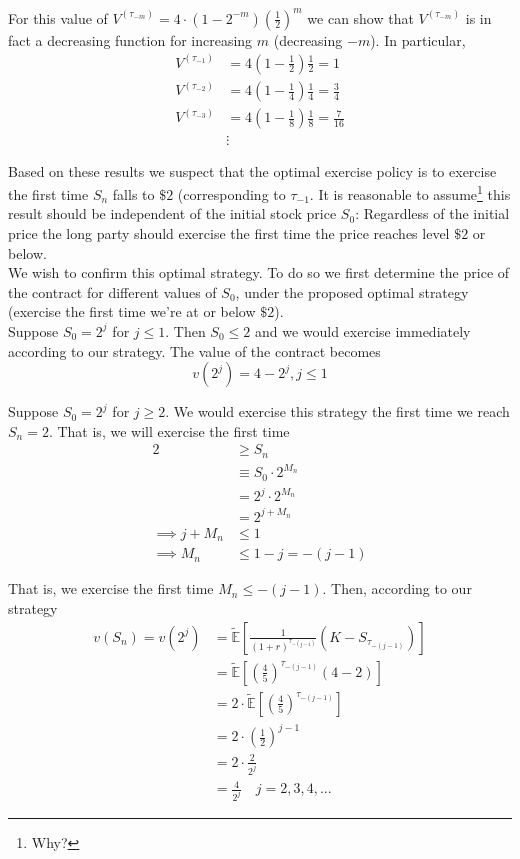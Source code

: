 \documentclass[12pt]{article}
\newlength\tindent
\renewcommand{\indent}{\hspace*{\tindent}}
\newcommand{\E}{\mathbb E}
\begin{document}
\indent For this value of $V^{(\tau_{-m})} = 4\cdot(1 - 2^{-m}) \left( \frac{1}{2}\right)^m$ we can show that $V^{(\tau_{-m})}$ is in fact a decreasing function for increasing $m$ (decreasing $-m$). In particular,
\begin{align*}
	V^{(\tau_{-1})} &= 4 \left(1 - \frac{1}{2}\right)\frac{1}{2} = 1 \\
	V^{(\tau_{-2})} &= 4 \left(1 - \frac{1}{4}\right)\frac{1}{4} = \frac{3}{4} \\
	V^{(\tau_{-3})} &= 4 \left(1 - \frac{1}{8}\right)\frac{1}{8} = \frac{7}{16} \\
	&\vdots
\end{align*}

\indent Based on these results we suspect that the optimal exercise policy is to exercise the first time $S_n$ falls to $\$2$ (corresponding to $\tau_{-1}$. It is reasonable to assume\footnote{Why?} this result should be independent of the initial stock price $S_0$: Regardless of the initial price the long party should exercise the first time the price reaches level $\$2$ or below. \\

\indent We wish to confirm this optimal strategy. To do so we first determine the price of the contract for different values of $S_0$, under the proposed optimal strategy (exercise the first time we're at or below $\$2$). \\

\indent Suppose $S_0 = 2^j$ for $j \leq 1$. Then $S_0 \leq 2$ and we would exercise immediately according to our strategy. The value of the contract becomes
\begin{equation*}
	v(2^j) = 4 - 2^j, j \leq 1
\end{equation*}

\indent Suppose $S_0 = 2^j$ for $j \geq 2$. We would exercise this strategy the first time we reach $S_n = 2$. That is, we will exercise the first time
\begin{align*}
	2 &\geq S_n \\
	&\equiv S_0 \cdot 2^{M_n} \\
	&= 2^j \cdot 2^{M_n} \\
	&= 2^{j + M_n} \\
	\implies j + M_n &\leq 1 \\ 
	\implies M_n &\leq 1 - j = -(j - 1)
\end{align*}

That is, we exercise the first time $M_n \leq -(j - 1)$. Then, according to our strategy
\begin{align*}
	v(S_n) = v(2^j) &= \tilde{\E} \left[ \frac{1}{(1 + r)^{\tau_{-(j - 1)}}} \left(K - S_{\tau_{-(j - 1)}} \right) \right] \\
	&= \tilde{\E} \left[ \left( \frac{4}{5} \right)^{\tau_{-(j - 1)}} \left( 4 - 2 \right) \right] \\
	&= 2\cdot \tilde{\E} \left[ \left( \frac{4}{5} \right)^{\tau_{-(j - 1)}} \right] \\
	&= 2 \cdot \left( \frac{1}{2} \right)^{j - 1} \\
	&= 2 \cdot \frac{2}{2^j} \\
	&= \frac{4}{2^j} \quad j = 2,3,4,...
\end{align*}
\end{document}
